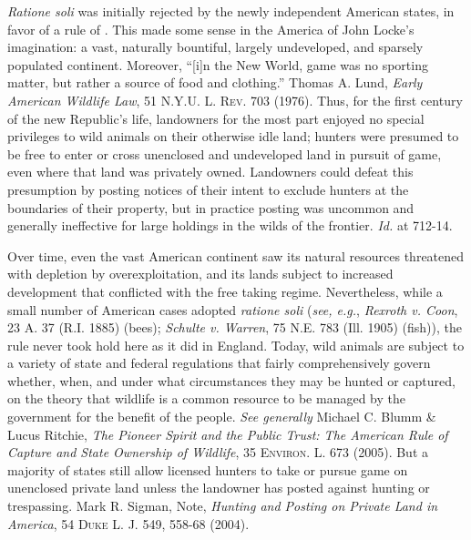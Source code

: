 \textit{Ratione soli} was initially rejected by the newly independent American
states, in favor of a rule of . This made some sense in the
America of John Locke's imagination: a vast, naturally bountiful, largely
undeveloped, and sparsely populated continent. Moreover, ``[i]n the New World,
game was no sporting matter, but rather a source of food and clothing.'' Thomas
A. Lund, \textit{Early American Wildlife Law}, 51 \textsc{N.Y.U. L. Rev.} 703
(1976). Thus, for the first century of the new Republic's life, landowners for
the most part enjoyed no special privileges to wild animals on their otherwise
idle land; hunters were presumed to be free to enter or cross unenclosed and
undeveloped land in pursuit of game, even where that land was privately owned.
Landowners could defeat this presumption by posting notices of their intent to
exclude hunters at the boundaries of their property, but in practice posting was
uncommon and generally ineffective for large holdings in the wilds of the
frontier. \textit{Id.} at 712-14.

Over time, even the vast American continent saw its natural resources threatened
with depletion by overexploitation, and its lands subject to increased
development that conflicted with the free taking regime. Nevertheless, while a
small number of American cases adopted \textit{ratione soli} (\textit{see,
e.g.}, \emph{Rexroth v. Coon}, 23 A. 37 (R.I. 1885) (bees); \emph{Schulte v.
Warren}, 75 N.E. 783 (Ill. 1905) (fish)), the rule never took hold here as it
did in England. Today, wild animals are subject to a variety of state and
federal regulations that fairly comprehensively govern whether, when, and under
what circumstances they may be hunted or captured, on the theory that wildlife
is a common resource to be managed by the government for the benefit of the
people. \textit{See generally} Michael C. Blumm \& Lucus Ritchie, \textit{The
Pioneer Spirit and the Public Trust: The American Rule of Capture and State
Ownership of Wildlife}, 35 \textsc{Environ. L.} 673 (2005). But a majority of
states still allow licensed hunters to take or pursue game on unenclosed private
land unless the landowner has posted against hunting or trespassing. Mark R.
Sigman, Note, \emph{Hunting and Posting on Private Land in America}, 54
\textsc{Duke
L. J.} 549, 558-68 (2004).


